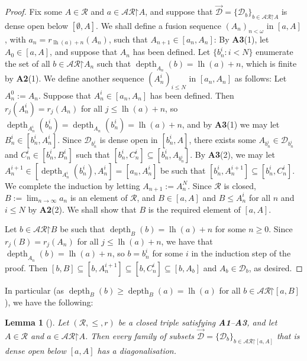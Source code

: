\documentclass[10pt,a4paper]{amsart}
\theoremstyle{plain}
\numberwithin{equation}{section}
\newtheorem{lemma}[theorem]{Lemma}
\theoremstyle{definition}
\newcommand{\func}{\operatorname}
\newcommand{\cal}{\mathcal}
\newcommand{\restrictedto}{\mathord{\upharpoonright}}
\newcommand{\lh}{\func{lh}}
\newcommand{\depth}{\func{depth}}
\newcommand{\D}{\cal{D}}
\begin{document}
\begin{proof}
    Fix some $A \in \cal{R}$ and $a \in \cal{AR}\restrictedto A$, and suppose that $\vec{\D} = \{\D_b\}_{b\in\cal{AR}\restrictedto A}$ is dense open below $[\emptyset,A]$. We shall define a fusion sequence $(A_n)_{n<\omega}$ in $[a,A]$, with $a_n = r_{\lh(a)+n}(A_n)$, such that $A_{n+1} \in [a_n,A_n]$: By \textbf{A3}(1), let $A_0 \in [a,A]$, and suppose that $A_n$ has been defined. Let $\{b_n^i : i < N\}$ enumerate the set of all $b \in \cal{AR}\restrictedto A_n$ such that $\depth_{A_n}(b) = \lh(a) + n$, which is finite by \textbf{A2}(1). We define another sequence $(A_n^i)_{i \leq N}$ in $[a_n,A_n]$ as follows: Let $A_n^0 := A_n$. Suppose that $A_n^i \in [a_n,A_n]$ has been defined. Then $r_j(A_n^i) = r_j(A_n)$ for all $j \leq \lh(a)+n$, so $\depth_{A_n^i}(b_n^i) = \depth_{A_n}(b_n^i) = \lh(a)+n$, and by \textbf{A3}(1) we may let $B_n^i \in [b_n^i,A_n^i]$. Since $\D_{b_n^i}$ is dense open in $[b_n^i,A]$, there exists some $A_{b_n^i} \in \D_{b_n^i}$ and $C_n^i \in [b_n^i,B_n^i]$ such that $[b_n^i,C_n^i] \subseteq [b_n^i,A_{b_n^i}]$. By \textbf{A3}(2), we may let $A_n^{i+1} \in [\depth_{A_n^i}(b_n^i),A_n^i] = [a_n,A_n^i]$ be such that $[b_n^i,A_n^{i+1}] \subseteq [b_n^i,C_n^i]$. We complete the induction by letting $A_{n+1} := A_n^N$. Since $\cal{R}$ is closed, $B := \lim_{n\to\infty} a_n$ is an element of $\cal{R}$, and $B \in [a,A]$ and $B \leq A_n^i$ for all $n$ and $i \leq N$ by \textbf{A2}(2). We shall show that $B$ is the required element of $[a,A]$.

    Let $b \in \cal{AR}\restrictedto B$ be such that $\depth_B(b) = \lh(a) + n$ for some $n \geq 0$. Since $r_j(B) = r_j(A_n)$ for all $j \leq \lh(a)+n$, we have that $\depth_{A_n}(b) = \lh(a)+n$, so $b = b_n^i$ for some $i$ in the induction step of the proof. Then $[b,B] \subseteq [b,A_n^{i+1}] \subseteq [b,C_n^i] \subseteq [b,A_b]$ and $A_b \in \D_b$, as desired.
\end{proof}

In particular (as $\depth_B(b) \geq \depth_B(a) = \lh(a)$ for all $b \in \cal{AR}\restrictedto[a,B]$), we have the following:

\begin{lemma}[{\cite[Lemma 3.16]{Y24}}]
\label{lem:R.is.semiselective}
    Let $(\cal{R},\leq,r)$ be a closed triple satisfying \textbf{A1}--\textbf{A3}, and let $A \in \cal{R}$ and $a \in \cal{AR}\restrictedto A$. Then every family of subsets $\vec{\D} = \{\D_b\}_{b \in \cal{AR}\restrictedto[a,A]}$ that is dense open below $[a,A]$ has a diagonalisation.
\end{lemma}
\end{document}
